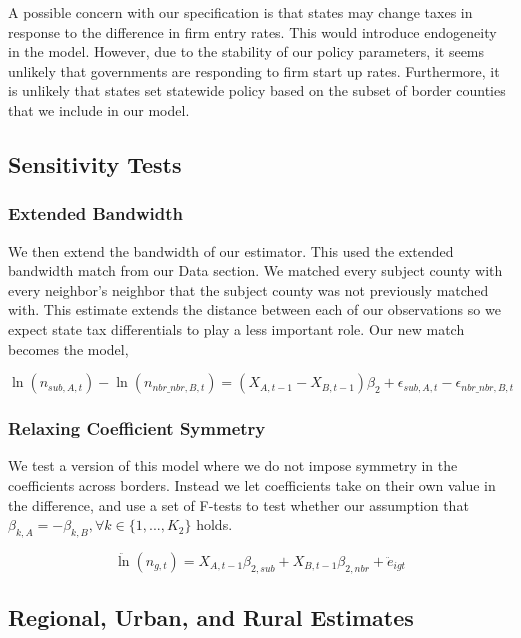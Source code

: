 A possible concern with our specification is that states may change taxes in response to the difference in firm entry rates.  This would introduce endogeneity in the model.  However, due to the stability of our policy parameters, it seems unlikely that governments are responding to firm start up rates.  Furthermore, it is unlikely that states set statewide policy based on the subset of border  counties that we include in our model.

\subsection{Sensitivity Tests}

\subsubsection{Extended Bandwidth}

We then extend the bandwidth of our estimator. This used the extended bandwidth match from our Data section. We matched every subject county with every neighbor's neighbor that the subject county was not previously matched with. This estimate extends the distance between each of our observations so we expect state tax differentials to play a less important role. Our new match becomes the model,

\begin{equation}
\ln(n_{sub,A,t})-\ln(n_{nbr\_nbr,B,t}) = (X_{A,t-1}-X_{B,t-1})\beta_{2} + \epsilon_{sub,A,t}-\epsilon_{nbr\_nbr,B,t}
\end{equation}

\subsubsection{Relaxing Coefficient Symmetry}
We test a version of this model where we do not impose symmetry in the coefficients across borders. Instead we let coefficients take on their own value in the difference, and use a set of F-tests to test whether our assumption that $\beta_{k,A} = - \beta_{k,B}, \forall k \in \{1,...,K_{2}\}$ holds. 

\begin{equation}\label{sense1}
\ddot \ln(n_{g,t}) = X_{A,t-1}\beta_{2,sub}+X_{B,t-1}\beta_{2,nbr}+ \ddot e_{igt} 
\end{equation}

\subsection{Regional, Urban, and Rural Estimates}

